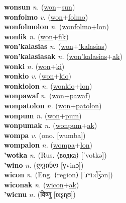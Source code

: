 \textbf{wonsun} \textit{n.} (\hyperref[won]{won}+\hyperref[sun]{sun})
 \label{wonsun} \\
\textbf{wonfolmo} \textit{v.} (\hyperref[won]{won}+\hyperref[folmo]{folmo})
 \label{wonfolmo} \\
\textbf{wonfolmolon} \textit{n.} (\hyperref[wonfolmo]{wonfolmo}+\hyperref[lon]{lon})
 \label{wonfolmolon} \\
\textbf{wonfik} \textit{n.} (\hyperref[won]{won}+\hyperref[fik]{fik})
 \label{wonfik} \\
\textbf{won'kalasias} \textit{n.} (\hyperref[won]{won}+\hyperref['kalasias]{'kalasias})
 \label{won'kalasias} \\
\textbf{won'kalasiasak} \textit{n.} (\hyperref[won'kalasias]{won'kalasias}+\hyperref[ak]{ak})
 \label{won'kalasiasak} \\
\textbf{wonki} \textit{n.} (\hyperref[won]{won}+\hyperref[ki]{ki})
 \label{wonki} \\
\textbf{wonkio} \textit{v.} (\hyperref[won]{won}+\hyperref[kio]{kio})
 \label{wonkio} \\
\textbf{wonkiolon} \textit{n.} (\hyperref[wonkio]{wonkio}+\hyperref[lon]{lon})
 \label{wonkiolon} \\
\textbf{wonpawaf} \textit{n.} (\hyperref[won]{won}+\hyperref[pawaf]{pawaf})
 \label{wonpawaf} \\
\textbf{wonpatolon} \textit{n.} (\hyperref[won]{won}+\hyperref[patolon]{patolon})
 \label{wonpatolon} \\
\textbf{wonpum} \textit{n.} (\hyperref[won]{won}+\hyperref[pum]{pum})
 \label{wonpum} \\
\textbf{wonpumak} \textit{n.} (\hyperref[wonpum]{wonpum}+\hyperref[ak]{ak})
 \label{wonpumak} \\
\textbf{wompa} \textit{v.} (ono. [wumba])
 \label{wompa} \\
\textbf{wompalon} \textit{n.} (\hyperref[wompa]{wompa}+\hyperref[lon]{lon})
 \label{wompalon} \\
\textbf{'wotka} \textit{n.} (Rus. ⟨водка⟩ [ˈvotkə])
 \label{'wotka} \\
\textbf{'wino} \textit{n.} ({\georgian{}ღვინო} [ɣvinɔ])
 \label{'wino} \\
\textbf{wicon} \textit{n.} (Eng. ⟨region⟩ [ˈɹʷiːd͡ʒən])
 \label{wicon} \\
\textbf{wiconak} \textit{n.} (\hyperref[wicon]{wicon}+\hyperref[ak]{ak})
 \label{wiconak} \\
\textbf{'wicnu} \textit{n.} ({\devanagari{}विष्णु} [ʋɪʂɳʊ])
 \label{'wicnu} \\
